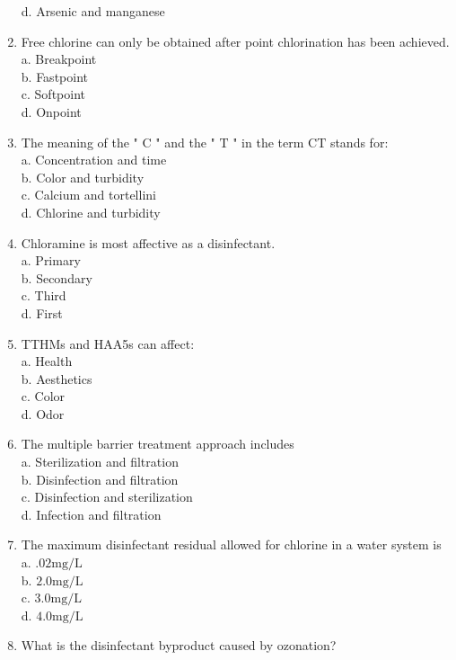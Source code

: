 \begin{enumerate}[1.]
d. Arsenic and manganese\\
\item Free chlorine can only be obtained after point chlorination has been achieved.\\
a. Breakpoint\\
b. Fastpoint\\
c. Softpoint\\
d. Onpoint\\
\item The meaning of the " $\mathrm{C}$ " and the " $\mathrm{T}$ " in the term $\mathrm{CT}$ stands for:\\
a. Concentration and time\\
b. Color and turbidity\\
c. Calcium and tortellini\\
d. Chlorine and turbidity\\
\item Chloramine is most affective as a disinfectant.\\
a. Primary\\
b. Secondary\\
c. Third\\
d. First\\
\item TTHMs and HAA5s can affect:\\
a. Health\\
b. Aesthetics\\
c. Color\\
d. Odor\\
\item The multiple barrier treatment approach includes\\
a. Sterilization and filtration\\
b. Disinfection and filtration\\
c. Disinfection and sterilization\\
d. Infection and filtration\\
\item The maximum disinfectant residual allowed for chlorine in a water system is\\
a. $.02 \mathrm{mg} / \mathrm{L}$\\
b. $2.0 \mathrm{mg} / \mathrm{L}$\\
c. $3.0 \mathrm{mg} / \mathrm{L}$\\
d. $4.0 \mathrm{mg} / \mathrm{L}$\\
\item What is the disinfectant byproduct caused by ozonation?\\

\end{enumerate}
